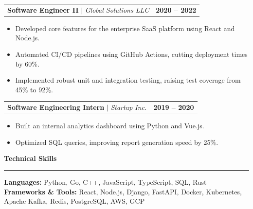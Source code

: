 \documentclass[10pt,a4paper]{article}
\begin{document}
\vspace{2mm}
\noindent
\begin{tabularx}{\linewidth}{@{}Xr@{}}
\textbf{Software Engineer II} $\vert$ \textit{Global Solutions LLC} & \textbf{2020 -- 2022} \\
\end{tabularx}

\begin{itemize}[leftmargin=*,noitemsep]
    \item Developed core features for the enterprise SaaS platform using React and Node.js.
    \item Automated CI/CD pipelines using GitHub Actions, cutting deployment times by 60\%.
    \item Implemented robust unit and integration testing, raising test coverage from 45\% to 92\%.
\end{itemize}

\vspace{2mm}
\noindent
\begin{tabularx}{\linewidth}{@{}Xr@{}}
\textbf{Software Engineering Intern} $\vert$ \textit{Startup Inc.} & \textbf{2019 -- 2020} \\
\end{tabularx}

\begin{itemize}[leftmargin=*,noitemsep]
    \item Built an internal analytics dashboard using Python and Vue.js.
    \item Optimized SQL queries, improving report generation speed by 25\%.
\end{itemize}

\vspace{4mm}
\noindent\textbf{\large Technical Skills} \\
\rule{\linewidth}{0.5pt}

\textbf{Languages:} Python, Go, C++, JavaScript, TypeScript, SQL, Rust \\
\textbf{Frameworks \& Tools:} React, Node.js, Django, FastAPI, Docker, Kubernetes, Apache Kafka, Redis, PostgreSQL, AWS, GCP
\end{document}
